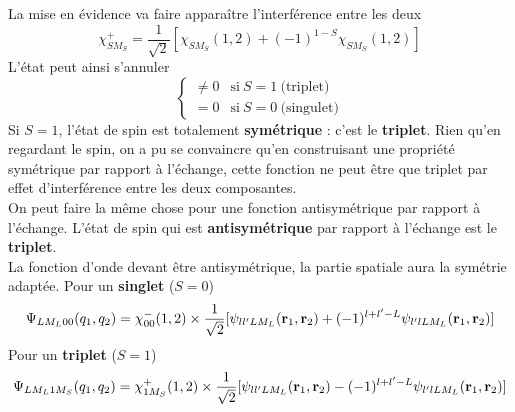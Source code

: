 La mise en évidence va faire apparaître l'interférence entre les deux
\begin{equation}
\chi^+_{SM_S} = \frac{1}{\sqrt{2}} [ \chi_{SM_S} (1,2) + (-1)^{1-S}  \chi_{SM_S} (1,2) ]
\end{equation}
L'état peut ainsi s'annuler
\begin{equation}
 \left\{ \begin{array}{ll}
\neq 0   &  \mbox{si}~S=1~\mbox{(triplet)} \\
= 0   &  \mbox{si}~S=0~\mbox{(singulet)} 
\end{array} \right.
\end{equation}
Si $S=1$, l'état de spin est totalement \textbf{symétrique} : c'est le \textbf{triplet}. Rien
qu'en regardant le spin, on a pu se convaincre qu'en construisant une propriété symétrique par
rapport à l'échange, cette fonction ne peut être que triplet par effet d'interférence entre les
deux composantes. \\

On peut faire la même chose pour une fonction antisymétrique par rapport à l'échange. L'état de 
spin qui est \textbf{antisymétrique} par rapport à l'échange est le \textbf{triplet}.\\

La fonction
d'onde devant être antisymétrique, la partie spatiale aura la symétrie adaptée. Pour un
\textbf{singlet} ($S=0$)
\begin{equation}
\Psi_{LM_L 00}(q_1,q_2) = \chi^{-}_{00}(1,2) \times  \frac{1}{\sqrt{2}} [ \psi_{ll' LM_L} ({\bf r}_1, {\bf r}_2)+
(-1)^{l+l'-L}  \psi_{l'lLM_L} ({\bf r}_1, {\bf r}_2) ]
\end{equation}
Pour un \textbf{triplet} ($S=1$)
\begin{equation}
\Psi_{LM_L 1M_S}(q_1,q_2) = \chi^{+}_{1M_S}(1,2) \times  \frac{1}{\sqrt{2}} [ \psi_{ll' LM_L} ({\bf r}_1, {\bf r}_2) -
(-1)^{l+l'-L}  \psi_{l'lLM_L} ({\bf r}_1, {\bf r}_2) ]
\end{equation}

